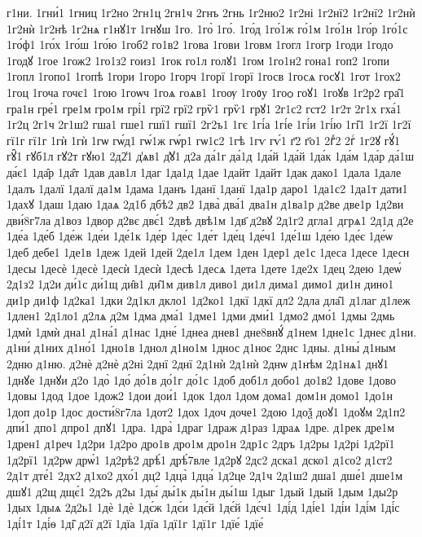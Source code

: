 {г1ни.
1гни́1
1гниц
1г2но
2гн1ц
2гн1ч
2гнъ
2гнь
1г2ню2
1г2ні
1г2нї2
1г2нї2
1г2нѝ
1г2нѝ
1г2нѣ
1г2нѧ
г1нꙋ1т
1гнꙋш
1го.
1го̀
1го́.
1го́д
1го́1ж
го́1м
1го́1н
1го́р
1го́1с
1го́ф1
1го́х
1го́ш
1го́ю
1гоб2
го1в2
1гова
1гови
1говм
1гогл
1гогр
1годи
1годо
1годꙋ
1гое
1гож2
1го1з2
гоиз1
1гок
го1л
голꙋ1
1гом
1го1н2
гона1
гоп2
1гопи
1гопл
1гопо1
1гопѣ
1гори
1горо
1горч
1горї
1горї
1госв
1госѧ
госꙋ1
1гот
1гох2
1гоц
1гоча
гочє1
1гою
1гоѡч
1гоѧ
гоѧв1
1гоѹ
1гоᲂу
1гоѻ
гоꙋ1
1гоꙋв
1г2р2
гра̑1
гра1н
гре́1
гре1м
гро1м
грі́1
грї2
грї2
грѷ1
грѷ1
грꙋ1
2г1с2
гст2
1г2т
2г1х
гха́1
1г2ц
2г1ч
2г1ш2
гша1
гше1
гшї1
гшї1
2г2ъ1
1гє
1гі́а
1гі́е
1гі́и
1гі́ю
1гі̑1
1г2ї
1г2ї
гї1г
гї1г
1гѝ
1гѝ
1гѡ
гѡ́д1
гѡ́1ж
гѡ́р1
гѡ1с2
1гѣ
1гѵ
гѵ́1
г҃2
г҃о1
2гⷣ2
2гⷭ
1г2ꙋ
гꙋ́1
гꙋ̑1
гꙋб1л
гꙋ2т
гꙋю1
2д2̾1
д̾ѧв1
д̾ꙋ1
д2а
да́1г
да́1д
1да́й
1да́й
1да́к
1да́м
1да́р
да́1ш
да́є1
1да̑р
1да̑т
1дав
дав1л
1даг
1да1д
1дае
1дайт
1дайт
1дак
дако1
1дала
1дале
1далъ
1далї
1далї
да1м
1дама
1данъ
1данї
1данї
1да1р
даро1
1да1с2
1да1т
дати1
1дахꙋ
1даш
1даю
1даѧ
2д1б
дбѣ2
дв2
1два̀
два́1
два1н
д1ва1р
д2ве
две1р
1д2ви
дви́8г7ла
д1воз
1двор
д2вє
двє́1
2двѣ
двѣ1м
1дв҃
д2вꙋ
2д1г2
дгла1
дгрѧ1
2д1д
д2е
1де́а
1де́б
1де́ж
1де́и
1де́1к
1де́р
1де́с
1де́т
1де́ц
1де́ч1
1де́1ш
1де́ю
1де́є
1де́ѡ
1деб
дебе1
1де1в
1деж
1дей
1дей
2де1л
1дем
1ден
1дер1
де1с
1деса
1десе
1десн
1десы
1десѐ
1десѐ
1десѝ
1десѝ
1десѣ
1десѧ
1дета
1дете
1де2х
1дец
2дею
1деѡ́
2д1з2
1д2и
ди́1с
ди́1щ
ди̑в1
ди̑1м
див1л
диво1
ди1л
дима1
димо1
ди1н
дино1
ди1р
ди1ф
1д2ка1
1дки
2д1кл
дкло1
1д2ко1
1дкї
1дкї
дл2
2дла
дла̑1
д1лаг
д1леж
1длен1
2д1ло1
д2лѧ
д2м
1дма
дма́1
1дме1
1дми
дми́1
1дмо2
дмо́1
1дмы
2дмь
1дмѝ
1дмѝ
дна1
д1на́1
д1нас
1дне́
1днеа
днев1
дне8внꙋ́
д1нем
1дне1с
1днеє
д1ни.
д1ни́
д1них
д1но́1
1дно1в
1днол
д1но1м
1днос
д1ноє
2днс
1дны.
д1ны́
д1ным
2дню
д1ню.
д2нѐ
д2нѐ
д2ні
2днї
2днї
2д1нѝ
2д1нѝ
2днѡ
д1нѣм
2д1нѧ1
днꙋ1
1днꙋе
1днꙋи
д2о
1до̀
1до́
до́1в
до́1г
до́1с
1доб
доб1л
добо1
до1в2
1дове
1дово
1довы
1дод
1дое
1дож2
1дои
дои́1
1док
1дол
1дом
дома1
дом1н
домо1
1до1н
1доп
до1р
1дос
дости́8г7ла
1дот2
1дох
1доч
доче1
2дою
1доѯ
доꙋ1
1доꙋм
2д1п2
дпи́1
дпо1
дпро1
дпꙋ1
1дра.
1дра̀
1драг
1драж
д1раз
1драѧ
1дре.
д1рек
дре1м
1дрен1
д1реч
1д2ри
1д2ро
дро1в
дро1м
дро1н
2др1с
2дръ
1д2ры
1д2рі
1д2рї1
1д2рї1
1д2рѡ
дрѡ́1
1д2рѣ2
дрѣ́1
дрѣ́7вле
1д2рꙋ
2дс2
дска1
дско1
д1со2
д1ст2
2д1т
дте́1
2дх2
д1хо2
дхо́1
дц2
1дца̀
1дца́
1д2це
2д1ч
2д1ш2
дша1
дше́1
дше1м
дшꙋ1
д2щ
дщє́1
2д2ъ
д2ы
1ды́
ды́1к
ды́1н
ды́1ш
1дыг
1дый
1дый
1дым
1ды2р
1дых
1дыѧ
2д2ь1
1дѐ
1дѐ
1дє́ж
1дє́и
1дє́й
1дє́й
1дє́ч1
1ді́д
1ді́е1
1ді́и
1ді́м
1ді́с
1ді́1т
1ді́ѳ
1ді̑
д2ї
д2ї
1дїа
1дїа
1дї1г
1дї1г
1дїе́
1дїе́
}
